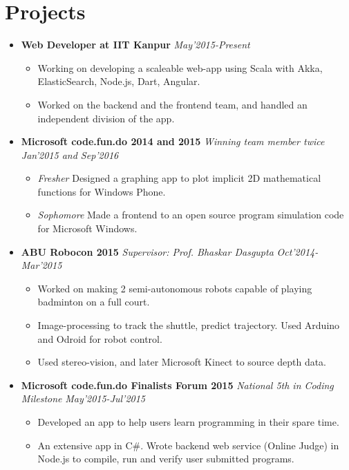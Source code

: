 \documentclass[11pt,a4paper]{article}
\begin{document}
\section*{Projects}
\vspace{-0.2cm}
\begin {itemize}

\item \textbf{\large{Web Developer at IIT Kanpur}} \hfill\textit{May'2015-Present}
  \begin{itemize}[leftmargin=*]
    \setlength \itemsep{0em}
    \item Working on developing a scaleable web-app using Scala with Akka, ElasticSearch, Node.js, Dart, Angular. 
    \item Worked on the backend and the frontend team, and handled an independent division of the app.
  \end{itemize}

\vspace{0.1cm}
\item \textbf{\large{Microsoft code.fun.do 2014 and 2015}} \emph{Winning team member twice} \hfill\textit{ Jan'2015 and Sep'2016}
  \begin{itemize}[leftmargin=*]
    \setlength \itemsep{0em}
    \item \textit{Fresher} Designed a graphing app to plot implicit 2D mathematical functions for Windows Phone.
    \item \textit{Sophomore} Made a frontend to an open source program simulation code for Microsoft Windows.
    \end{itemize}

\vspace{0.1cm}
\item \textbf{\large{ABU Robocon 2015}} \emph{Supervisor: Prof. Bhaskar Dasgupta} \hfill\textit{ Oct'2014-Mar'2015}
  \begin{itemize}[leftmargin=*]
    \setlength \itemsep{0em}
    \item Worked on making 2 semi-autonomous robots capable of playing badminton on a full court.
    \item Image-processing to track the shuttle, predict trajectory. Used Arduino and Odroid for robot control.
    \item Used stereo-vision, and later Microsoft Kinect to source depth data.
    \end{itemize}

\vspace{0.1cm}
\item \textbf{\large{Microsoft code.fun.do Finalists Forum 2015}} \emph{National 5th in Coding Milestone} \hfill\textit{ May'2015-Jul'2015}
  \begin{itemize}[leftmargin=*]
    \setlength \itemsep{0em}
    \item Developed an app to help users learn programming in their spare time.
    \item An extensive app in C\#. Wrote backend web service (Online Judge) in Node.js to compile, run and verify user submitted programs.
    \end{itemize}
\end{itemize}
\end{document}
